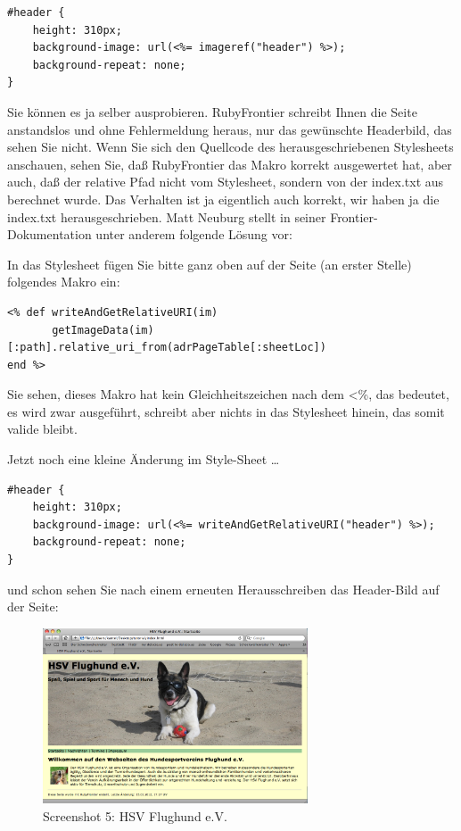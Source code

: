 \documentclass[11pt]{report}
\begin{document}
\begin{verbatim}
#header {
    height: 310px;
    background-image: url(<%= imageref("header") %>);
    background-repeat: none;
}
\end{verbatim}

Sie können es ja selber ausprobieren. RubyFrontier schreibt Ihnen die
Seite anstandslos und ohne Fehlermeldung heraus, nur das gewünschte
Headerbild, das sehen Sie nicht. Wenn Sie sich den Quellcode des
herausgeschriebenen Stylesheets anschauen, sehen Sie, daß RubyFrontier
das Makro korrekt ausgewertet hat, aber auch, daß der relative Pfad
nicht vom Stylesheet, sondern von der index.txt aus berechnet
wurde. Das Verhalten ist ja eigentlich auch korrekt, wir haben ja die
index.txt herausgeschrieben. Matt Neuburg stellt in seiner
Frontier-Dokumentation unter anderem folgende Lösung vor:


In das Stylesheet fügen Sie bitte ganz oben auf der Seite (an erster
Stelle) folgendes Makro ein:


\begin{verbatim}
<% def writeAndGetRelativeURI(im)
       getImageData(im)[:path].relative_uri_from(adrPageTable[:sheetLoc])
end %>
\end{verbatim}

Sie sehen, dieses Makro hat kein Gleichheitszeichen nach dem <\%, das
bedeutet, es wird zwar ausgeführt, schreibt aber nichts in das
Stylesheet hinein, das somit valide bleibt.


Jetzt noch eine kleine Änderung im Style-Sheet …


\begin{verbatim}
#header {
    height: 310px;
    background-image: url(<%= writeAndGetRelativeURI("header") %>);
    background-repeat: none;
}
\end{verbatim}

und schon sehen Sie nach einem erneuten Herausschreiben das
Header-Bild auf der Seite:

\begin{figure}[h!]
\centering
\includegraphics[width=0.7\textwidth]{./images/flughund05.png}
\caption{\label{flughund05}Screenshot 5: HSV Flughund e.V.}
\end{figure}
\end{document}
